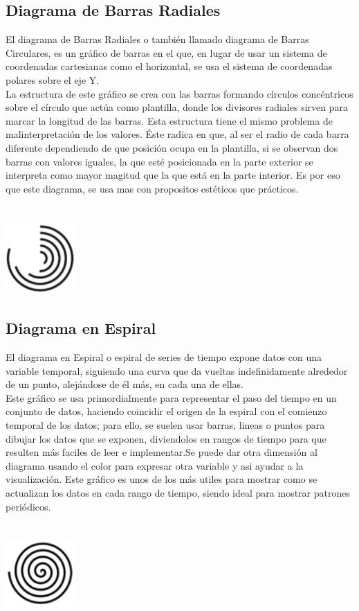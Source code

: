 \documentclass{article}\usepackage[]{graphicx}\usepackage[]{color}
\begin{document}
\subsection{Diagrama de Barras Radiales}
El diagrama de Barras Radiales o tambi\'en llamado diagrama de Barras Circulares, es un gr\'afico de barras en el que, en lugar de usar un sistema de coordenadas cartesianas como el horizontal, se usa el sistema de coordenadas polares sobre el eje Y.~\\
La estructura de este gr\'afico se crea con las barras formando c\'irculos conc\'entricos sobre el c\'irculo que act\'ua como plantilla, donde los divisores radiales sirven para marcar la longitud de las barras. Esta estructura tiene el mismo problema de malinterpretaci\'on de los valores. \'Este radica en que, al ser el radio de cada barra diferente dependiendo de que posici\'on ocupa en la plantilla, si se observan dos barras con valores iguales, la que est\'e posicionada en la parte exterior se interpreta como mayor magitud que la que est\'a en la parte interior. Es por eso que este diagrama, se usa mas con propositos est\'eticos que pr\'acticos.~\\~\\~\\
\vbox{
    \centering
    \includegraphics[width=0.2\textwidth]{imag/barras_radiales}
}
\subsection{Diagrama en Espiral}
El diagrama en Espiral o espiral de series de tiempo expone datos con una variable temporal, siguiendo una curva que da vueltas indefinidamente alrededor de un punto, alej\'andose de \'el m\'as, en cada una de ellas.~\\
Este gr\'afico se usa primordialmente para representar el paso del tiempo en un conjunto de datos, haciendo coincidir el origen de la espiral con el comienzo temporal de los datos; para ello, se suelen usar barras, lineas o puntos para dibujar los datos que se exponen, diviendolos en rangos de tiempo para que resulten m\'as faciles de leer e implementar.Se puede dar otra dimensi\'on al diagrama usando el color para expresar otra variable y asi ayudar a la visualizaci\'on. Este gr\'afico es unos de los m\'as utiles para mostrar como se actualizan los datos en cada rango de tiempo, siendo ideal para mostrar patrones peri\'odicos.
~\\~\\~\\
\vbox{
    \centering
    \includegraphics[width=0.2\textwidth]{imag/espiral}
}
\clearpage
\end{document}
